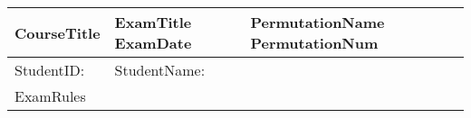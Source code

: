\documentclass[11pt]{article}
\begin{document}
\pagestyle{empty}

\begin{table}[ht]
  \begin{center}
    \begin{tabular}{|l|l|l|}
      \hline
      {\bf {{{CourseTitle}}} } \quad &  {{{ExamTitle}}} {{{ExamDate}}} \quad \quad \quad \quad \quad & {{{PermutationName}}} {{{PermutationNum}}}  \\
      \hline
      {{StudentID}}: & \multicolumn{2}{|l|}{ {{StudentName}}: } \\ \hline
      \multicolumn{3}{|l|}{
      \begin{minipage}{\textwidth}
      {{{ExamRules}}}
      \end{minipage}}
      \\ \hline
    \end{tabular}
  \end{center}
\end{table}
\end{document}
